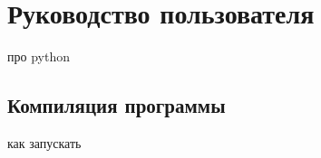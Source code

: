 \section{Руководство пользователя}
        про python
    \subsection{Компиляция программы}
        как запускать
